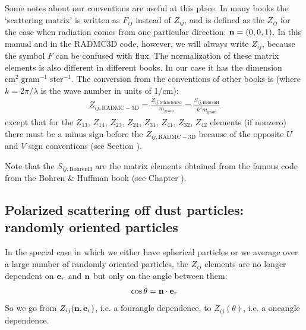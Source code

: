 \documentclass[letterpaper,10pt,english]{sphinxmanual}
\begin{document}
Some notes about our conventions are useful at this place. In many books the
‘scattering matrix’ is written as \(F_{ij}\) instead of \(Z_{ij}\), and is
defined as the \(Z_{ij}\) for the case when radiation comes from one
particular direction: \({\bf n}=(0,0,1)\). In this manual and in the RADMC\sphinxhyphen{}3D
code, however, we will always write \(Z_{ij}\), because the symbol \(F\) can be
confused with flux. The normalization of these matrix elements is also
different in different books. In our case it has the dimension
\(\mathrm{cm}^2\;\mathrm{gram}^{-1}\;\mathrm{ster}^{-1}\).
The conversion from the conventions of other books is
(where \(k=2\pi/\lambda\) is the wave number in units of 1/cm):
\begin{equation*}
\begin{split}Z_{ij,\mathrm{RADMC-3D}} = \frac{Z_{ij,\mathrm{Mishchenko}}}{m_{\mathrm{grain}}}
= \frac{S_{ij,\mathrm{BohrenH}}}{k^2m_{\mathrm{grain}}}\end{split}
\end{equation*}
except that for the \(Z_{13}\), \(Z_{14}\), \(Z_{23}\),
\(Z_{24}\), \(Z_{31}\), \(Z_{41}\), \(Z_{32}\), \(Z_{42}\)
elements (if non\sphinxhyphen{}zero) there must be a minus sign before the
\(Z_{ij,\mathrm{RADMC-3D}}\) because of the opposite \(U\) and \(V\)
sign conventions (see Section {\hyperref[\detokenize{dustradtrans:sec-stokes-convent-differences}]{}}).

Note that the \(S_{ij,\mathrm{BohrenH}}\) are the matrix elements obtained
from the famous  code from the Bohren \& Huffman book
(see Chapter {\hyperref[\detokenize{opacitieswww:chap-acquiring-opacities}]{}}).


\subsection{Polarized scattering off dust particles: randomly oriented particles}
\label{\detokenize{dustradtrans:polarized-scattering-off-dust-particles-randomly-oriented-particles}}
In the special case in which we either have spherical particles or we
average over a large number of randomly oriented particles, the \(Z_{ij}\)
elements are no longer dependent on  \({\bf e}_r\) and \({\bf n}\) but
only on the angle between them:
\begin{equation*}
\begin{split}\cos\theta = {\bf n}\cdot{\bf e}_r\end{split}
\end{equation*}
So we go from \(Z_{ij}({\bf n},{\bf e}_r)\), i.e. a four\sphinxhyphen{}angle dependence, to
\(Z_{ij}(\theta)\), i.e. a one\sphinxhyphen{}angle dependence.
\end{document}
